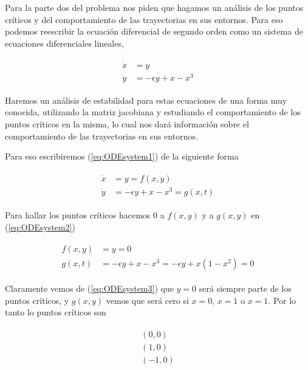 \documentclass[a4paper,10pt]{article}
\begin{document}
Para la parte dos del problema nos piden que hagamos un análisis de los puntos críticos
y del comportamiento de las trayectorias en sus entornos. Para eso podemos reescribir
la ecuación diferencial de segundo orden como un sistema de ecuaciones diferenciales
lineales,


\begin{align}
 \begin{split}
  \dot{x} &= y \\
  \dot{y} &= - \epsilon y + x - x^3
 \end{split}
 \label{eq:ODEsystem1}
\end{align}

Haremos un análisis de estabilidad para estas ecuaciones de una forma muy conocida, utilizando
la matriz jacobiana y estudiando el comportamiento de los puntos críticos en la misma,
lo cual nos dará información sobre el comportamiento de las trayectorias en sus entornos.

\vspace{.3cm}

Para eso escribiremos (\ref{eq:ODEsystem1}) de la siguiente forma

\begin{align}
 \begin{split}
  \dot{x} &= y = f(x,y)\\
  \dot{y} &= - \epsilon y + x - x^3 = g(x,t)
 \end{split}
 \label{eq:ODEsystem2}
\end{align}

Para hallar los puntos críticos hacemos $0$ a $f(x,y)$ y a $g(x,y)$ en (\ref{eq:ODEsystem2})

\begin{align}
 \begin{split}
  f(x,y) &= y = 0\\
  g(x,t) &= -\epsilon y + x - x^3 = -\epsilon y + x(1 - x^2) = 0
 \label{eq:ODEsystem3}
 \end{split}
\end{align}

Claramente vemos de (\ref{eq:ODEsystem3}) que $y=0$ será siempre parte de los puntos críticos,
y $g(x,y)$ vemos que será cero si $x=0$, $x=1$ o $x=1$. Por lo tanto lo puntos críticos son

\begin{align}
 \begin{split}
  (0,0) \\
  (1,0) \\
  (-1,0) 
 \label{eq:puntoscriticos1}
 \end{split}
\end{align}
\end{document}
